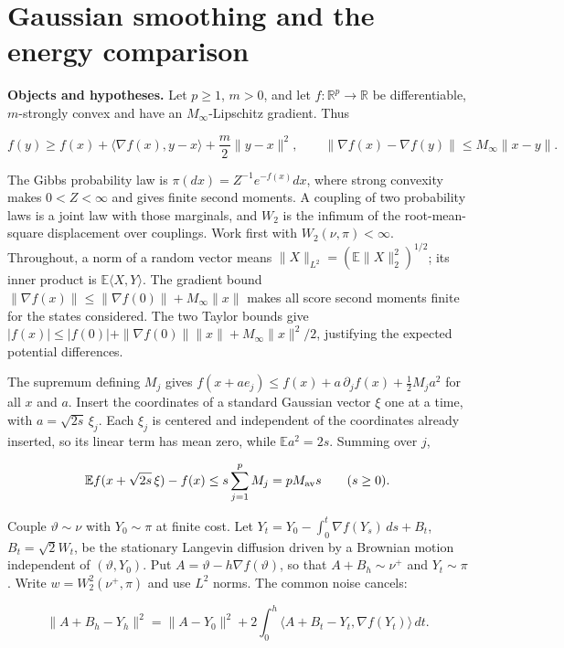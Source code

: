 \documentclass[11pt,a4paper]{article}
\begin{document}
\section{\texorpdfstring{Gaussian smoothing and the energy comparison}{Gaussian smoothing and the energy comparison}}



\textbf{Objects and hypotheses.} Let \(p\ge1\), \(m>0\), and let \(f:\mathbb R^p\to\mathbb R\) be differentiable, \(m\)-strongly convex and have an \(M_\infty\)-Lipschitz gradient. Thus

\[f(y)\ge f(x)+\langle\nabla f(x),y-x\rangle+\frac m2\|y-x\|^2,\qquad\|\nabla f(x)-\nabla f(y)\|\le M_\infty\|x-y\|.\]

The Gibbs probability law is \(\pi(dx)=Z^{-1}e^{-f(x)}dx\), where strong convexity makes \(0<Z<\infty\) and gives finite second moments. A coupling of two probability laws is a joint law with those marginals, and \(W_2\) is the infimum of the root-mean-square displacement over couplings. Work first with \(W_2(\nu,\pi)<\infty\). Throughout, a norm of a random vector means \(\|X\|_{L^2}=(\mathbb E\|X\|_2^2)^{1/2}\); its inner product is \(\mathbb E\langle X,Y\rangle\). The gradient bound \(\|\nabla f(x)\|\le\|\nabla f(0)\|+M_\infty\|x\|\) makes all score second moments finite for the states considered. The two Taylor bounds give \(|f(x)|\le|f(0)|+\|\nabla f(0)\|\|x\|+M_\infty\|x\|^2/2\), justifying the expected potential differences.




The
supremum defining \(M_j\) gives
\(f(x+ae_j)\le f(x)+a\,\partial_jf(x)+\tfrac12M_ja^2\) for all \(x\) and
\(a\). Insert the coordinates of a standard Gaussian vector \(\xi\) one at a
time, with \(a=\sqrt{2s}\,\xi_j\). Each \(\xi_j\) is centered and independent
of the coordinates already inserted, so its linear term has mean zero, while
\(\mathbb E a^2=2s\). Summing over \(j\),


\[\mathbb E f(x+\sqrt{2s}\,\xi)-f(x)\le s\sum_{j=1}^pM_j=pM_{\rm av}s
\qquad(s\ge0).\]


Couple \(\vartheta\sim\nu\) with \(Y_0\sim\pi\) at finite cost. Let
\(Y_t=Y_0-\int_0^t\nabla f(Y_s)\,ds+B_t\), \(B_t=\sqrt2W_t\), be the
stationary Langevin diffusion driven by a Brownian motion independent of
\((\vartheta,Y_0)\). Put \(A=\vartheta-h\nabla f(\vartheta)\), so that
\(A+B_h\sim\nu^+\) and \(Y_t\sim\pi\). Write \(w=W_2^2(\nu^+,\pi)\) and use
\(L^2\) norms. The common noise cancels:


\[\|A+B_h-Y_h\|^2=\|A-Y_0\|^2+2\int_0^h\langle A+B_t-Y_t,\nabla f(Y_t)\rangle\,dt.\]
\end{document}
